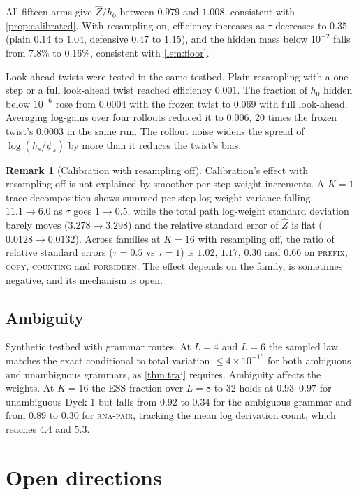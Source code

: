 \documentclass[11pt]{article}
\theoremstyle{definition}
\newtheorem{remark}[theorem]{Remark}
\newcommand{\Zh}{\widehat Z}
\begin{document}
All fifteen arms give $\Zh/h_0$ between $0.979$ and $1.008$, consistent with \cref{prop:calibrated}. With
resampling on, efficiency increases as $\tau$ decreases to $0.35$ (plain $0.14$ to $1.04$, defensive $0.47$ to
$1.15$), and the hidden mass below $10^{-2}$ falls from 7.8\% to 0.16\%, consistent with \cref{lem:floor}.

Look-ahead twists were tested in the same testbed. Plain resampling with a one-step or a full look-ahead twist
reached efficiency $0.001$. The fraction of $h_0$ hidden below $10^{-6}$ rose from $0.0004$ with the frozen twist
to $0.069$ with full look-ahead. Averaging log-gains over four rollouts reduced it to $0.006$, 20 times the frozen
twist's $0.0003$ in the same run. The rollout noise widens the spread of $\log(h_s/\psi_s)$ by more than it
reduces the twist's bias.

\begin{remark}[Calibration with resampling off]
Calibration's effect with resampling off is not explained by smoother per-step weight increments. A $K=1$ trace
decomposition shows summed per-step log-weight variance falling $11.1\to6.0$ as $\tau$ goes $1\to0.5$, while the
total path log-weight standard deviation barely moves ($3.278\to3.298$) and the relative standard error of $\Zh$
is flat ($0.0128\to0.0132$). Across families at $K=16$ with resampling off, the ratio of relative standard errors
($\tau=0.5$ vs $\tau=1$) is $1.02$, $1.17$, $0.30$ and $0.66$ on \textsc{prefix}, \textsc{copy},
\textsc{counting} and \textsc{forbidden}. The effect depends on the family, is sometimes negative, and its
mechanism is open.
\end{remark}

\subsection{Ambiguity}\label{sec:expamb}
Synthetic testbed with grammar routes. At $L=4$ and $L=6$ the sampled law matches the exact conditional to total
variation $\le4\times10^{-16}$ for both ambiguous and unambiguous grammars, as \cref{thm:traj} requires. Ambiguity
affects the weights.
At $K=16$ the ESS fraction over $L=8$ to $32$ holds at $0.93$--$0.97$ for unambiguous Dyck-1 but falls from $0.92$
to $0.34$ for the ambiguous grammar and from $0.89$ to $0.30$ for \textsc{rna-pair}, tracking the mean log
derivation count, which reaches $4.4$ and $5.3$.

\section{Open directions}\label{sec:open}
\end{document}
